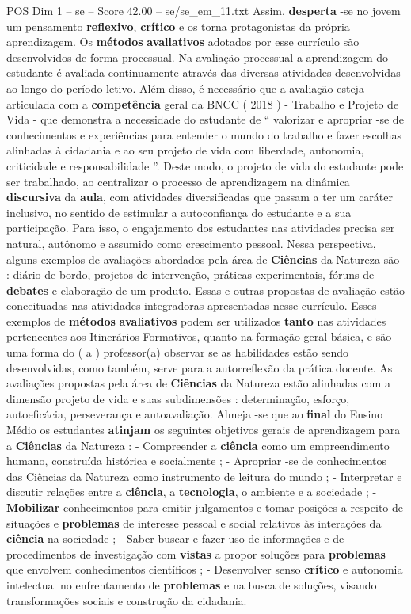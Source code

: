 \begin{textsample}{POS Dim 1 – se – Score 42.00 – se/se\_em\_11.txt}
Assim, \textbf{desperta} -se no jovem um pensamento \textbf{reflexivo}, \textbf{crítico} e os torna protagonistas da própria aprendizagem.
Os \textbf{métodos} \textbf{avaliativos} adotados por esse currículo são desenvolvidos de forma processual.
Na avaliação processual a aprendizagem do estudante é avaliada continuamente através das diversas atividades desenvolvidas ao longo do período letivo.
Além disso, é necessário que a avaliação esteja articulada com a \textbf{competência} geral da BNCC ( 2018 ) - Trabalho e Projeto de Vida - que demonstra a necessidade do estudante de “ valorizar e apropriar -se de conhecimentos e experiências para entender o mundo do trabalho e fazer escolhas alinhadas à cidadania e ao seu projeto de vida com liberdade, autonomia, criticidade e responsabilidade ”.
Deste modo, o projeto de vida do estudante pode ser trabalhado, ao centralizar o processo de aprendizagem na dinâmica \textbf{discursiva} da \textbf{aula}, com atividades diversificadas que passam a ter um caráter inclusivo, no sentido de estimular a autoconfiança do estudante e a sua participação.
Para isso, o engajamento dos estudantes nas atividades precisa ser natural, autônomo e assumido como crescimento pessoal.
Nessa perspectiva, alguns exemplos de avaliações abordados pela área de \textbf{Ciências} da Natureza são : diário de bordo, projetos de intervenção, práticas experimentais, fóruns de \textbf{debates} e elaboração de um produto.
Essas e outras propostas de avaliação estão conceituadas nas atividades integradoras apresentadas nesse currículo.
Esses exemplos de \textbf{métodos} \textbf{avaliativos} podem ser utilizados \textbf{tanto} nas atividades pertencentes aos Itinerários Formativos, quanto na formação geral básica, e são uma forma do ( a ) professor(a) observar se as habilidades estão sendo desenvolvidas, como também, serve para a autorreflexão da prática docente.
As avaliações propostas pela área de \textbf{Ciências} da Natureza estão alinhadas com a dimensão projeto de vida e suas subdimensões : determinação, esforço, autoeficácia, perseverança e autoavaliação.
Almeja -se que ao \textbf{final} do Ensino Médio os estudantes \textbf{atinjam} os seguintes objetivos gerais de aprendizagem para a \textbf{Ciências} da Natureza : - Compreender a \textbf{ciência} como um empreendimento humano, construída histórica e socialmente ; - Apropriar -se de conhecimentos das Ciências da Natureza como instrumento de leitura do mundo ; - Interpretar e discutir relações entre a \textbf{ciência}, a \textbf{tecnologia}, o ambiente e a sociedade ; - \textbf{Mobilizar} conhecimentos para emitir julgamentos e tomar posições a respeito de situações e \textbf{problemas} de interesse pessoal e social relativos às interações da \textbf{ciência} na sociedade ; - Saber buscar e fazer uso de informações e de procedimentos de investigação com \textbf{vistas} a propor soluções para \textbf{problemas} que envolvem conhecimentos científicos ; - Desenvolver senso \textbf{crítico} e autonomia intelectual no enfrentamento de \textbf{problemas} e na busca de soluções, visando transformações sociais e construção da cidadania.

\end{textsample}
